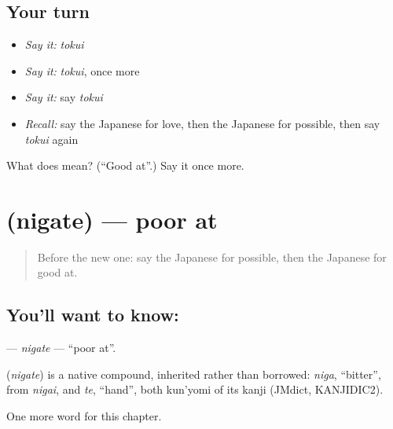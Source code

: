 \subsection*{Your turn}
\begin{itemize}
\raggedright
  \item \emph{Say it:} \emph{tokui}
  \item \emph{Say it:} \emph{tokui}, once more
  \item \emph{Say it:} say \emph{tokui}
  \item \emph{Recall:} say the Japanese for love, then the Japanese for possible, then say \emph{tokui} again
\end{itemize}

\begin{tcolorbox}[breakable,colback=teal!4,colframe=teal!35!black,title={Before you move on}]
What does  mean? (\textquotedblleft{}Good at\textquotedblright{}.) Say it once more.
\end{tcolorbox}
\section[\texorpdfstring{\ja{にがて} (nigate)}{にがて (nigate)}]{ (nigate) — poor at}

\label{lesson:JA-C95-nigate}



\begin{quote}
Before the new one: say the Japanese for possible, then the Japanese for good at.
\end{quote}

\subsection*{You'll want to know: }
\textbf{} — \emph{nigate} — \textquotedblleft{}poor at\textquotedblright{}.

\begin{cousinweb}
\textbf{} (\emph{nigate}) is a native compound, inherited rather than borrowed: \emph{niga}, \textquotedblleft{}bitter\textquotedblright{}, from \emph{nigai}, and \emph{te}, \textquotedblleft{}hand\textquotedblright{}, both kun'yomi of its kanji (JMdict, KANJIDIC2).
\end{cousinweb}

\begin{grammarlens}[title={What you've built}]
One more word for this chapter.
\end{grammarlens}

